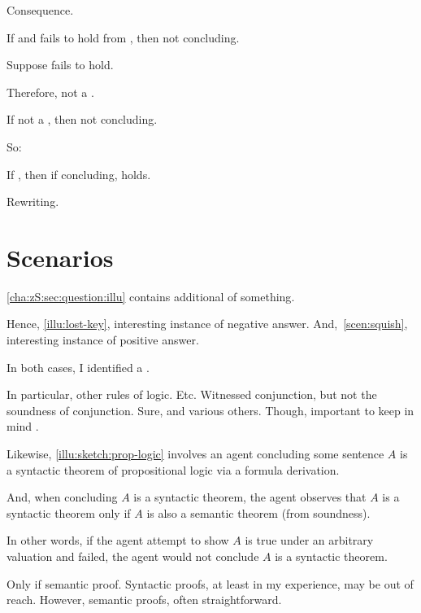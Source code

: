 \begin{note}
  Consequence.

  \begin{proposition}
    If \requ{} and \ros{} fails to hold from \agpe{}, then not concluding.
    \begin{argument}
      Suppose \ros{} fails to hold.

      Therefore, not a \fc{}.

      If not a \fc{}, then not concluding.
    \end{argument}
  \end{proposition}

  So:

  \begin{proposition}
    If \requ{}, then if concluding, \ros{} holds.

    \begin{argument}
      Rewriting.
    \end{argument}
  \end{proposition}
\end{note}



\section{Scenarios}
\label{cha:zS:sec:question:scenarios}

\begin{note}
  \autoref{cha:zS:sec:question:illu} contains additional  of {\color{red} something}.
\end{note}

\begin{note}
  Hence, \autoref{illu:lost-key}, interesting instance of negative answer.
  And,~\autoref{scen:squish}, interesting instance of positive answer.

  In both cases, I identified a \curb{}.

  In particular, other rules of logic.
  Etc.
  Witnessed conjunction, but not the soundness of conjunction.
  Sure, and various others.
  Though, important to keep in mind \curb{}.
\end{note}

\begin{note}
  Likewise, \autoref{illu:sketch:prop-logic} involves an agent concluding some sentence \(A\) is a syntactic theorem of propositional logic via a formula derivation.

  And, when concluding \(A\) is a syntactic theorem, the agent observes that \(A\) is a syntactic theorem only if \(A\) is also a semantic theorem (from soundness).

  In other words, if the agent attempt to show \(A\) is true under an arbitrary valuation and failed, the agent would not conclude \(A\) is a syntactic theorem.

  Only if semantic proof.
  Syntactic proofs, at least in my experience, may be out of reach.
  However, semantic proofs, often straightforward.
\end{note}

